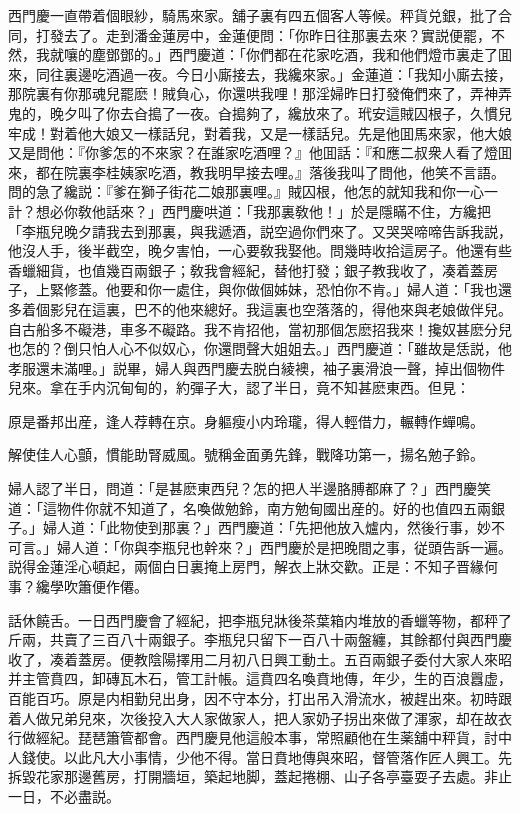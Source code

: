 西門慶一直帶着個眼紗，騎馬來家。舖子裏有四五個客人等候。秤貨兑銀，批了合同，打發去了。走到潘金蓮房中，金蓮便問：「你昨日往那裏去來？實説便罷，不然，我就嚷的塵鄧鄧的。」西門慶道：「你們都在花家吃酒，我和他們燈巿裏走了囬來，同往裏邊吃酒過一夜。今日小廝接去，我纔來家。」金蓮道：「我知小廝去接，那院裏有你那魂兒罷麽！賊負心，你還哄我哩！那淫婦昨日打發俺們來了，弄神弄鬼的，晚夕叫了你去㒲搗了一夜。㒲搗夠了，纔放來了。玳安這賊囚根子，久慣兒牢成！對着他大娘又一樣話兒，對着我，又是一樣話兒。先是他囬馬來家，他大娘又是問他：『你爹怎的不來家？在誰家吃酒哩？』他囬話：『和應二叔衆人看了燈囬來，都在院裏李桂姨家吃酒，教我明早接去哩。』落後我叫了問他，他笑不言語。問的急了纔説：『爹在獅子街花二娘那裏哩。』賊囚根，他怎的就知我和你一心一計？想必你敎他話來？」西門慶哄道：「我那裏敎他！」於是隱瞞不住，方纔把「李瓶兒晚夕請我去到那裏，與我遞酒，説空過你們來了。又哭哭啼啼告訴我説，他沒人手，後半截空，晚夕害怕，一心要敎我娶他。問幾時收拾這房子。他還有些香蠟細貨，也值幾百兩銀子；敎我會經紀，替他打發；銀子教我收了，凑着蓋房子，上緊修蓋。他要和你一處住，與你做個姊妹，恐怕你不肯。」婦人道：「我也還多着個影兒在這裏，巴不的他來總好。我這裏也空落落的，得他來與老娘做伴兒。自古船多不礙港，車多不礙路。我不肯招他，當初那個怎麽招我來！攙奴甚麽分兒也怎的？倒只怕人心不似奴心，你還問聲大姐姐去。」西門慶道：「雖故是恁説，他孝服還未滿哩。」説畢，婦人與西門慶去脱白綾襖，袖子裏滑浪一聲，掉出個物件兒來。拿在手内沉甸甸的，約彈子大，認了半日，竟不知甚麽東西。但見：

\begin{myquote}
原是番邦出産，逢人荐轉在京。身軀瘦小内玲瓏，得人輕借力，輾轉作蟬鳴。

解使佳人心顫，慣能助腎威風。號稱金面勇先鋒，戰降功第一，揚名勉子鈴。
\end{myquote}

婦人認了半日，問道：「是甚麽東西兒？怎的把人半邊胳膊都麻了？」西門慶笑道：「這物件你就不知道了，名喚做勉鈴，南方勉甸國出産的。好的也值四五兩銀子。」婦人道：「此物使到那裏？」西門慶道：「先把他放入爐内，然後行事，妙不可言。」婦人道：「你與李瓶兒也幹來？」西門慶於是把晚間之事，従頭告訴一遍。説得金蓮淫心頓起，兩個白日裏掩上房門，解衣上牀交歡。正是：不知子晋緣何事？纔學吹簫便作僊。

話休饒舌。一日西門慶會了經紀，把李瓶兒牀後茶葉箱内堆放的香蠟等物，都秤了斤兩，共賣了三百八十兩銀子。李瓶兒只留下一百八十兩盤纏，其餘都付與西門慶收了，凑着蓋房。便教陰陽擇用二月初八日興工動土。五百兩銀子委付大家人來昭并主管賁四，卸磚瓦木石，管工計帳。這賁四名喚賁地傳，年少，生的百浪囂虚，百能百巧。原是内相勤兒出身，因不守本分，打出吊入滑流水，被趕出來。初時跟着人做兄弟兒來，次後投入大人家做家人，把人家奶子拐出來做了渾家，却在故衣行做經紀。琵琶簫管都會。西門慶見他這般本事，常照顧他在生薬舖中秤貨，討中人錢使。以此凡大小事情，少他不得。當日賁地傳與來昭，督管落作匠人興工。先拆毀花家那邊舊房，打開牆垣，築起地脚，蓋起捲棚、山子各亭臺耍子去處。非止一日，不必盡説。

